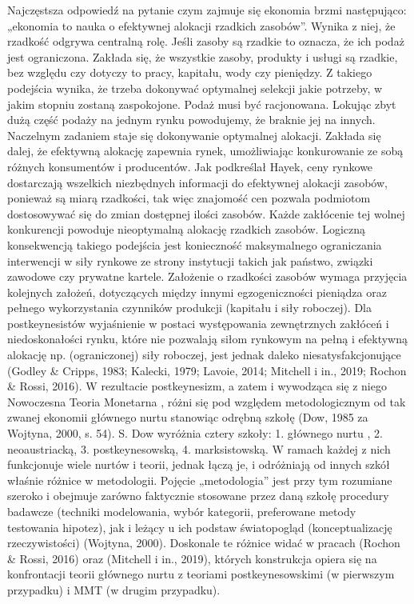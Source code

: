 \documentclass[
]{book}
\begin{document}
Najczęstsza odpowiedź na pytanie czym zajmuje się ekonomia brzmi następująco: „ekonomia to nauka o efektywnej alokacji rzadkich zasobów''. Wynika z niej, że rzadkość odgrywa centralną rolę. Jeśli zasoby są rzadkie to oznacza, że ich podaż jest ograniczona. Zakłada się, że wszystkie zasoby, produkty i usługi są rzadkie, bez względu czy dotyczy to pracy, kapitału, wody czy pieniędzy. Z takiego podejścia wynika, że trzeba dokonywać optymalnej selekcji jakie potrzeby, w jakim stopniu zostaną zaspokojone. Podaż musi być racjonowana. Lokując zbyt dużą część podaży na jednym rynku powodujemy, że braknie jej na innych. Naczelnym zadaniem staje się dokonywanie optymalnej alokacji. Zakłada się dalej, że efektywną alokację zapewnia rynek, umożliwiając konkurowanie ze sobą różnych konsumentów i producentów. Jak podkreślał Hayek, ceny rynkowe dostarczają wszelkich niezbędnych informacji do efektywnej alokacji zasobów, ponieważ są miarą rzadkości, tak więc znajomość cen pozwala podmiotom dostosowywać się do zmian dostępnej ilości zasobów. Każde zakłócenie tej wolnej konkurencji powoduje nieoptymalną alokację rzadkich zasobów. Logiczną konsekwencją takiego podejścia jest konieczność maksymalnego ograniczania interwencji w siły rynkowe ze strony instytucji takich jak państwo, związki zawodowe czy prywatne kartele. Założenie o rzadkości zasobów wymaga przyjęcia kolejnych założeń, dotyczących między innymi egzogeniczności pieniądza oraz pełnego wykorzystania czynników produkcji (kapitału i siły roboczej). Dla postkeynesistów wyjaśnienie w postaci występowania zewnętrznych zakłóceń i niedoskonałości rynku, które nie pozwalają siłom rynkowym na pełną i efektywną alokację np. (ograniczonej) siły roboczej, jest jednak daleko niesatysfakcjonujące (Godley \& Cripps, 1983; Kalecki, 1979; Lavoie, 2014; Mitchell i in., 2019; Rochon \& Rossi, 2016). W rezultacie postkeynesizm, a zatem i wywodząca się z niego Nowoczesna Teoria Monetarna , różni się pod względem metodologicznym od tak zwanej ekonomii głównego nurtu stanowiąc odrębną szkołę (Dow, 1985 za Wojtyna, 2000, s. 54). S. Dow wyróżnia cztery szkoły:
1. głównego nurtu ,
2. neoaustriacką,
3. postkeynesowską,
4. marksistowską.
W ramach każdej z nich funkcjonuje wiele nurtów i teorii, jednak łączą je, i odróżniają od innych szkół właśnie różnice w metodologii. Pojęcie „metodologia'' jest przy tym rozumiane szeroko i obejmuje zarówno faktycznie stosowane przez daną szkołę procedury badawcze (techniki modelowania, wybór kategorii, preferowane metody testowania hipotez), jak i leżący u ich podstaw światopogląd (konceptualizację rzeczywistości) (Wojtyna, 2000). Doskonale te różnice widać w pracach (Rochon \& Rossi, 2016) oraz (Mitchell i in., 2019), których konstrukcja opiera się na konfrontacji teorii głównego nurtu z teoriami postkeynesowskimi (w pierwszym przypadku) i MMT (w drugim przypadku).
\end{document}
